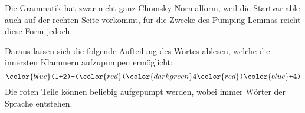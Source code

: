 \begin{loesung}
Die Grammatik hat zwar nicht ganz Chomsky-Normalform, weil die Startvariable
auch auf der rechten Seite vorkommt, für die Zwecke des Pumping Lemmas
reicht diese Form jedoch.
\begin{center}
\def\dx{0.6}
\def\dy{0.8}
\def\punkt#1#2{
	({((#1)-0.5*(#2))*\dx},{(-(#2))*\dy})
}
\def\terminal#1#2#3{
	\fill[color=white,opacity=0.8] \punkt{#1}{#2} circle[radius=0.20];
	\node at \punkt{#1}{#2} {$#3\mathstrut$};
}
\def\gabel#1#2#3#4#5{
	\draw \punkt{#1}{#2} -- \punkt{#1}{#2+#3};
	\draw \punkt{#1}{#2} -- \punkt{#1+#4}{#2+#4};
	\fill[color=white,opacity=0.8] \punkt{#1}{#2} circle[radius=0.20];
	\node at \punkt{#1}{#2} {$#5\mathstrut$};
}
\def\wort{
	\node at \punkt{0.25}{12.5}  {\texttt{(}\strut};
	\node at \punkt{1.25}{12.5}  {\texttt{1}\strut};
	\node at \punkt{2.25}{12.5}  {\texttt{+}\strut};
	\node at \punkt{3.25}{12.5}  {\texttt{2}\strut};
	\node at \punkt{4.25}{12.5}  {\texttt{)}\strut};
	\node at \punkt{5.25}{12.5}  {\texttt{+}\strut};
	\node at \punkt{6.25}{12.5}  {\texttt{(}\strut};
	\node at \punkt{7.25}{12.5}  {\texttt{(}\strut};
	\node at \punkt{8.25}{12.5}  {\texttt{3}\strut};
	\node at \punkt{9.25}{12.5}  {\texttt{)}\strut};
	\node at \punkt{10.25}{12.5} {\texttt{+}\strut};
	\node at \punkt{11.25}{12.5} {\texttt{4}\strut};
	\node at \punkt{12.25}{12.5} {\texttt{)}\strut};
}
\def\dreieck#1#2#3{
	\fill[color=#3!10]
		\punkt{#1-0.5}{12.3} rectangle ++({(13.3-#2)*\dx},-0.5);
	\fill[color=#3!20] \punkt{#1-0.5}{12.3}
		-- \punkt{#1-0.5}{#2-1}
		-- \punkt{#1+0.5+(12.3-#2)}{12.3};
	\draw[color=#3] \punkt{#1-0.5}{12.3}
		-- \punkt{#1-0.5}{#2-1}
		-- \punkt{#1+0.5+(12.3-#2)}{12.3};
}
\end{center}
Daraus lassen sich die folgende Aufteilung des Wortes ablesen,
welche die innersten Klammern aufzupumpen ermöglicht:
\[
\bgroup
\color{blue}
\texttt{(1+2)+(}
\color{red}
\texttt{(}
\color{darkgreen}
\texttt{4}
\color{red}
\texttt{)}
\color{blue}
\texttt{+4)}
\egroup
\]
Die roten Teile können beliebig aufgepumpt werden, wobei immer
Wörter der Sprache entstehen.
\end{loesung}



